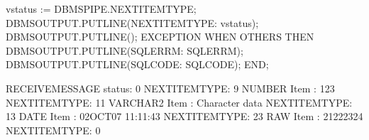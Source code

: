 \documentclass[letterpaper,10pt,english,openany,oneside]{sphinxmanual}
\begin{document}
\begin{sphinxVerbatim}[commandchars=\\\{\}]
    v\PYGZus{}status := DBMS\PYGZus{}PIPE.NEXT\PYGZus{}ITEM\PYGZus{}TYPE;
    DBMS\PYGZus{}OUTPUT.PUT\PYGZus{}LINE(\PYGZsq{}NEXT\PYGZus{}ITEM\PYGZus{}TYPE: \PYGZsq{} \textbar{}\textbar{} v\PYGZus{}status);
    DBMS\PYGZus{}OUTPUT.PUT\PYGZus{}LINE(\PYGZsq{}\PYGZhy{}\PYGZhy{}\PYGZhy{}\PYGZhy{}\PYGZhy{}\PYGZhy{}\PYGZhy{}\PYGZhy{}\PYGZhy{}\PYGZhy{}\PYGZhy{}\PYGZhy{}\PYGZhy{}\PYGZhy{}\PYGZhy{}\PYGZhy{}\PYGZhy{}\PYGZhy{}\PYGZhy{}\PYGZhy{}\PYGZhy{}\PYGZhy{}\PYGZhy{}\PYGZhy{}\PYGZhy{}\PYGZhy{}\PYGZhy{}\PYGZhy{}\PYGZhy{}\PYGZhy{}\PYGZhy{}\PYGZhy{}\PYGZhy{}\PYGZsq{});
EXCEPTION
    WHEN OTHERS THEN
        DBMS\PYGZus{}OUTPUT.PUT\PYGZus{}LINE(\PYGZsq{}SQLERRM: \PYGZsq{} \textbar{}\textbar{} SQLERRM);
        DBMS\PYGZus{}OUTPUT.PUT\PYGZus{}LINE(\PYGZsq{}SQLCODE: \PYGZsq{} \textbar{}\textbar{} SQLCODE);
END;

RECEIVE\PYGZus{}MESSAGE status: 0
\PYGZhy{}\PYGZhy{}\PYGZhy{}\PYGZhy{}\PYGZhy{}\PYGZhy{}\PYGZhy{}\PYGZhy{}\PYGZhy{}\PYGZhy{}\PYGZhy{}\PYGZhy{}\PYGZhy{}\PYGZhy{}\PYGZhy{}\PYGZhy{}\PYGZhy{}\PYGZhy{}\PYGZhy{}\PYGZhy{}\PYGZhy{}\PYGZhy{}\PYGZhy{}\PYGZhy{}\PYGZhy{}\PYGZhy{}\PYGZhy{}\PYGZhy{}\PYGZhy{}\PYGZhy{}\PYGZhy{}\PYGZhy{}\PYGZhy{}\PYGZhy{}
NEXT\PYGZus{}ITEM\PYGZus{}TYPE: 9
NUMBER Item   : 123
\PYGZhy{}\PYGZhy{}\PYGZhy{}\PYGZhy{}\PYGZhy{}\PYGZhy{}\PYGZhy{}\PYGZhy{}\PYGZhy{}\PYGZhy{}\PYGZhy{}\PYGZhy{}\PYGZhy{}\PYGZhy{}\PYGZhy{}\PYGZhy{}\PYGZhy{}\PYGZhy{}\PYGZhy{}\PYGZhy{}\PYGZhy{}\PYGZhy{}\PYGZhy{}\PYGZhy{}\PYGZhy{}\PYGZhy{}\PYGZhy{}\PYGZhy{}\PYGZhy{}\PYGZhy{}\PYGZhy{}\PYGZhy{}\PYGZhy{}\PYGZhy{}
NEXT\PYGZus{}ITEM\PYGZus{}TYPE: 11
VARCHAR2 Item : Character data
\PYGZhy{}\PYGZhy{}\PYGZhy{}\PYGZhy{}\PYGZhy{}\PYGZhy{}\PYGZhy{}\PYGZhy{}\PYGZhy{}\PYGZhy{}\PYGZhy{}\PYGZhy{}\PYGZhy{}\PYGZhy{}\PYGZhy{}\PYGZhy{}\PYGZhy{}\PYGZhy{}\PYGZhy{}\PYGZhy{}\PYGZhy{}\PYGZhy{}\PYGZhy{}\PYGZhy{}\PYGZhy{}\PYGZhy{}\PYGZhy{}\PYGZhy{}\PYGZhy{}\PYGZhy{}\PYGZhy{}\PYGZhy{}\PYGZhy{}\PYGZhy{}
NEXT\PYGZus{}ITEM\PYGZus{}TYPE: 13
DATE Item     : 02\PYGZhy{}OCT\PYGZhy{}07 11:11:43
\PYGZhy{}\PYGZhy{}\PYGZhy{}\PYGZhy{}\PYGZhy{}\PYGZhy{}\PYGZhy{}\PYGZhy{}\PYGZhy{}\PYGZhy{}\PYGZhy{}\PYGZhy{}\PYGZhy{}\PYGZhy{}\PYGZhy{}\PYGZhy{}\PYGZhy{}\PYGZhy{}\PYGZhy{}\PYGZhy{}\PYGZhy{}\PYGZhy{}\PYGZhy{}\PYGZhy{}\PYGZhy{}\PYGZhy{}\PYGZhy{}\PYGZhy{}\PYGZhy{}\PYGZhy{}\PYGZhy{}\PYGZhy{}\PYGZhy{}\PYGZhy{}
NEXT\PYGZus{}ITEM\PYGZus{}TYPE: 23
RAW Item      : 21222324
\PYGZhy{}\PYGZhy{}\PYGZhy{}\PYGZhy{}\PYGZhy{}\PYGZhy{}\PYGZhy{}\PYGZhy{}\PYGZhy{}\PYGZhy{}\PYGZhy{}\PYGZhy{}\PYGZhy{}\PYGZhy{}\PYGZhy{}\PYGZhy{}\PYGZhy{}\PYGZhy{}\PYGZhy{}\PYGZhy{}\PYGZhy{}\PYGZhy{}\PYGZhy{}\PYGZhy{}\PYGZhy{}\PYGZhy{}\PYGZhy{}\PYGZhy{}\PYGZhy{}\PYGZhy{}\PYGZhy{}\PYGZhy{}\PYGZhy{}\PYGZhy{}
NEXT\PYGZus{}ITEM\PYGZus{}TYPE: 0
\end{sphinxVerbatim}
\end{document}
